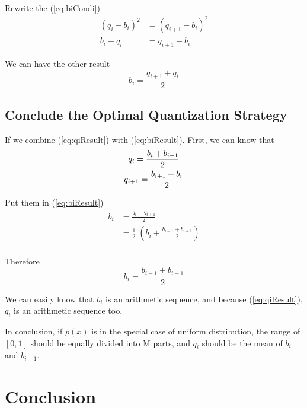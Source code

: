 \documentclass{article}
\begin{document}
Rewrite the (\ref{eq:biCondi})
\begin{equation*}
	\begin{aligned}
		(q_i - b_i)^2 &= (q_{i + 1} - b_i)^2 \\ 
		b_i - q_i &= q_{i + 1} - b_i
	\end{aligned}
\end{equation*}

We can have the other result
\begin{equation}
	b_i = \frac{q_{i + 1} + q_i}{2}
	\label{eq:biResult}
\end{equation}

\subsection{Conclude the Optimal Quantization Strategy}

If we combine (\ref{eq:qiResult}) with (\ref{eq:biResult}). First, we can know that 
\begin{gather}
	q_i = \frac{b_i + b_{i - 1}}{2} \notag \\ 
	q_{i + 1} = \frac{b_{i + 1} + b_i}{2} \notag
\end{gather}

Put them in (\ref{eq:biResult})
\begin{equation*}
	\begin{aligned}
		b_i &= \frac{q_i + q_{i + 1}}{2} \\ 
		&= \frac{1}{2} \; (b_i + \frac{b_{i - 1} + b_{i + 1}}{2}) \\ 
	\end{aligned}
\end{equation*}

Therefore
$$
	b_i = \frac{b_{i - 1} + b_{i + 1}}{2}
$$

We can easily know that $b_i$ is an arithmetic sequence, and because (\ref{eq:qiResult}), $q_i$ is an arithmetic sequence too. 

In conclusion, if $p(x)$ is in the special case of uniform distribution, the range of $[0, 1]$ should be equally divided into M parts, and $q_i$ should be the mean of $b_i$ and $b_{i + 1}$.

\section{Conclusion}






\begin{appendices}

\end{appendices}
\end{document}
